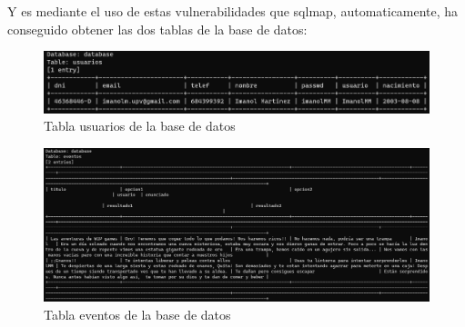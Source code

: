 \documentclass{report}
\begin{document}
                \clearpage
                Y es mediante el uso de estas vulnerabilidades que sqlmap, automaticamente, ha conseguido obtener las dos tablas de la base de datos:
                \begin{figure}[H]
                    \centering
                    \includegraphics[width=1\textwidth]{./img/vulnerabilidades/2.3/1.2.png}
                    \caption{Tabla usuarios de la base de datos}
                \end{figure}
                \begin{figure}[H]
                    \centering
                    \includegraphics[width=1\textwidth]{./img/vulnerabilidades/2.3/1.3.png}
                    \caption{Tabla eventos de la base de datos}
                \end{figure}
                \clearpage
\end{document}
